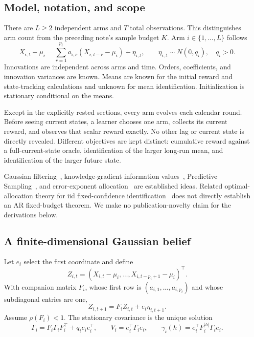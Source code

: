 \subsection{Model, notation, and scope}
There are $L\geq2$ independent arms and $T$ total observations. This distinguishes arm count from the preceding note's sample budget $K$. Arm $i\in\{1,\ldots,L\}$ follows
\begin{equation}
X_{i,t}-\mu_i=\sum_{r=1}^{p_i}a_{i,r}(X_{i,t-r}-\mu_i)+\eta_{i,t},\qquad
\eta_{i,t}\sim N(0,q_i),\quad q_i>0.
\label{ar_p_bandits:eq:ar}
\end{equation}
Innovations are independent across arms and time. Orders, coefficients, and innovation variances are known. Means are known for the initial reward and state-tracking calculations and unknown for mean identification. Initialization is stationary conditional on the means.

Except in the explicitly rested sections, every arm evolves each calendar round. Before seeing current states, a learner chooses one arm, collects its current reward, and observes that scalar reward exactly. No other lag or current state is directly revealed. Different objectives are kept distinct: cumulative reward against a full-current-state oracle, identification of the larger long-run mean, and identification of the larger future state.

Gaussian filtering~\cite{collected33}, knowledge-gradient information values~\cite{collected30}, Predictive Sampling~\cite{collected10}, and error-exponent allocation~\cite{collected32} are established ideas. Related optimal-allocation theory for iid fixed-confidence identification~\cite{collected12} does not directly establish an AR fixed-budget theorem. We make no publication-novelty claim for the derivations below.

\subsection{A finite-dimensional Gaussian belief}
Let $e_i$ select the first coordinate and define
\[
Z_{i,t}=(X_{i,t}-\mu_i,\ldots,X_{i,t-p_i+1}-\mu_i)^\top.
\]
With companion matrix $F_i$, whose first row is $(a_{i,1},\ldots,a_{i,p_i})$ and whose subdiagonal entries are one,
\begin{equation}
Z_{i,t+1}=F_iZ_{i,t}+e_i\eta_{i,t+1}.
\end{equation}
Assume $\rho(F_i)<1$. The stationary covariance is the unique solution
\begin{equation}
\Gamma_i=F_i\Gamma_iF_i^\top+q_ie_ie_i^\top,
\qquad V_i=e_i^\top\Gamma_ie_i,
\qquad \gamma_i(h)=e_i^\top F_i^{|h|}\Gamma_ie_i.
\label{ar_p_bandits:eq:stationary}
\end{equation}

